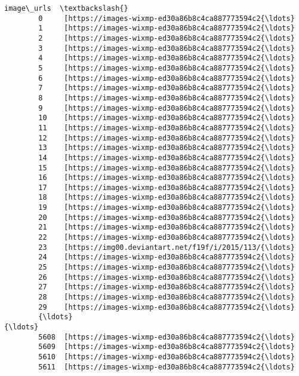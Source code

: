 \documentclass[11pt]{article}
\begin{document}
\begin{Verbatim}[commandchars=\\\{\}]
                                                     image\_urls  \textbackslash{}
        0     [https://images-wixmp-ed30a86b8c4ca887773594c2{\ldots}   
        1     [https://images-wixmp-ed30a86b8c4ca887773594c2{\ldots}   
        2     [https://images-wixmp-ed30a86b8c4ca887773594c2{\ldots}   
        3     [https://images-wixmp-ed30a86b8c4ca887773594c2{\ldots}   
        4     [https://images-wixmp-ed30a86b8c4ca887773594c2{\ldots}   
        5     [https://images-wixmp-ed30a86b8c4ca887773594c2{\ldots}   
        6     [https://images-wixmp-ed30a86b8c4ca887773594c2{\ldots}   
        7     [https://images-wixmp-ed30a86b8c4ca887773594c2{\ldots}   
        8     [https://images-wixmp-ed30a86b8c4ca887773594c2{\ldots}   
        9     [https://images-wixmp-ed30a86b8c4ca887773594c2{\ldots}   
        10    [https://images-wixmp-ed30a86b8c4ca887773594c2{\ldots}   
        11    [https://images-wixmp-ed30a86b8c4ca887773594c2{\ldots}   
        12    [https://images-wixmp-ed30a86b8c4ca887773594c2{\ldots}   
        13    [https://images-wixmp-ed30a86b8c4ca887773594c2{\ldots}   
        14    [https://images-wixmp-ed30a86b8c4ca887773594c2{\ldots}   
        15    [https://images-wixmp-ed30a86b8c4ca887773594c2{\ldots}   
        16    [https://images-wixmp-ed30a86b8c4ca887773594c2{\ldots}   
        17    [https://images-wixmp-ed30a86b8c4ca887773594c2{\ldots}   
        18    [https://images-wixmp-ed30a86b8c4ca887773594c2{\ldots}   
        19    [https://images-wixmp-ed30a86b8c4ca887773594c2{\ldots}   
        20    [https://images-wixmp-ed30a86b8c4ca887773594c2{\ldots}   
        21    [https://images-wixmp-ed30a86b8c4ca887773594c2{\ldots}   
        22    [https://images-wixmp-ed30a86b8c4ca887773594c2{\ldots}   
        23    [https://img00.deviantart.net/f19f/i/2015/113/{\ldots}   
        24    [https://images-wixmp-ed30a86b8c4ca887773594c2{\ldots}   
        25    [https://images-wixmp-ed30a86b8c4ca887773594c2{\ldots}   
        26    [https://images-wixmp-ed30a86b8c4ca887773594c2{\ldots}   
        27    [https://images-wixmp-ed30a86b8c4ca887773594c2{\ldots}   
        28    [https://images-wixmp-ed30a86b8c4ca887773594c2{\ldots}   
        29    [https://images-wixmp-ed30a86b8c4ca887773594c2{\ldots}   
        {\ldots}                                                 {\ldots}   
        5608  [https://images-wixmp-ed30a86b8c4ca887773594c2{\ldots}   
        5609  [https://images-wixmp-ed30a86b8c4ca887773594c2{\ldots}   
        5610  [https://images-wixmp-ed30a86b8c4ca887773594c2{\ldots}   
        5611  [https://images-wixmp-ed30a86b8c4ca887773594c2{\ldots}   

\end{Verbatim}
\end{document}
